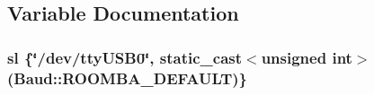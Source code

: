 \subsection{Variable Documentation}
\subsubsection[{\texorpdfstring{sl}{sl}}]{ sl \{\char`\"{}/dev/tty\+U\+S\+B0\char`\"{}, static\+\_\+cast$<$unsigned int$>$({\bf Baud\+::\+R\+O\+O\+M\+B\+A\+\_\+\+D\+E\+F\+A\+U\+LT})\}}\hypertarget{test4__all_c_o_m_2_pi-in-the-sky_8cpp_a4b5d2a4822c9b9ecddf5750239626d47}{}\label{test4__all_c_o_m_2_pi-in-the-sky_8cpp_a4b5d2a4822c9b9ecddf5750239626d47}
